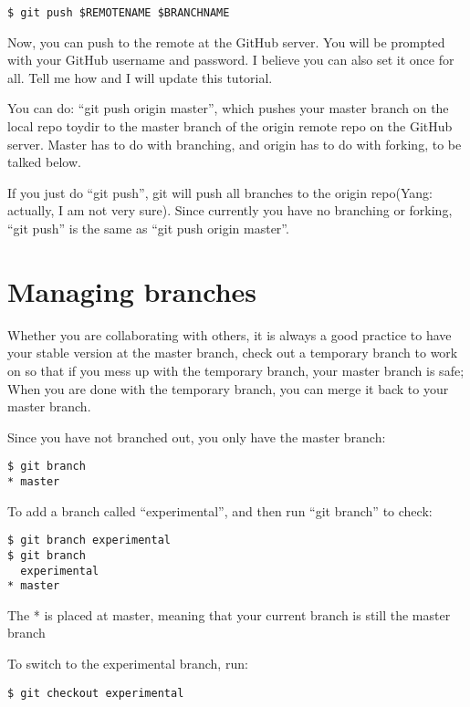 \documentclass{article} %
\newcommand{\q}[1]{``#1''}
\begin{document}
\begin{lstlisting}
$ git push $REMOTENAME $BRANCHNAME
\end{lstlisting}

Now, you can push to the remote at the GitHub server. You will be prompted with your GitHub username and password. I believe you can also set it once for all. Tell me how and I will update this tutorial.

You can do: \q{git push origin master}, which pushes your master branch on the local repo toydir to the master branch of the origin remote repo on the GitHub server. Master has to do with branching, and origin has to do with forking, to be talked below.

If you just do \q{git push}, git will push all branches to the origin repo(Yang: actually, I am not very sure). Since currently you have no branching or forking, \q{git push} is the same as \q{git push origin master}.


\section{Managing branches}

Whether you are collaborating with others, it is always a good practice to have your stable version at the master branch, check out a temporary branch to work on so that if you mess up with the temporary branch, your master branch is safe; When you are done with the temporary branch, you can merge it back to your master branch.

Since you have not branched out, you only have the master branch:

\begin{lstlisting}
$ git branch
* master
\end{lstlisting}

To add a branch called \q{experimental}, and then run \q{git branch} to check:

\begin{lstlisting}
$ git branch experimental
$ git branch
  experimental
* master
\end{lstlisting}

The * is placed at master, meaning that your current branch is still the master branch

To switch to the experimental branch, run:

\begin{lstlisting}
$ git checkout experimental
\end{lstlisting}
\end{document}
